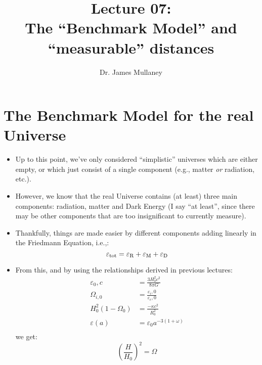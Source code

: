 \documentclass[11pt]{article}
\begin{document}
 
\title{Lecture 07:\\The ``Benchmark Model'' and \\``measurable'' distances}
\author{Dr. James Mullaney}
\maketitle
\section{The Benchmark Model for the real Universe}
\begin{itemize}
\item Up to this point, we've only considered ``simplistic'' universes which are either empty, or which just consist of a single component (e.g., matter {\it or} radiation, etc.).
\item However, we know that the real Universe contains (at least) three main components: radiation, matter and Dark Energy (I say ``at least'', since there may be other components that are too insignificant to currently measure).
\item Thankfully, things are made easier by different components adding linearly in the Friedmann Equation, i.e.,:
\begin{equation}
    \varepsilon{_{\rm tot}} = \varepsilon{_{\rm R}}+\varepsilon{_{\rm M}}+\varepsilon{_{\rm D}}
\end{equation}
\item From this, and by using the relationships derived in previous lectures:
\begin{align}
\varepsilon{_0,c}&=\frac{3H_0^2c^2}{8\pi G}\\
\Omega_{i,0}&=\frac{\varepsilon{_i,0}}{\varepsilon{_c,0}}\\
H_0^2(1-\Omega_0)&= \frac{-\kappa c^2}{R_0^2}\\
\varepsilon{(a)}&=\varepsilon{_0}a^{-3(1+\omega)}\\
\end{align}
we get:
\begin{equation}
\left(\frac{H}{H_0}\right)^2=\Omega
\end{equation}
\end{itemize}
\end{document}
